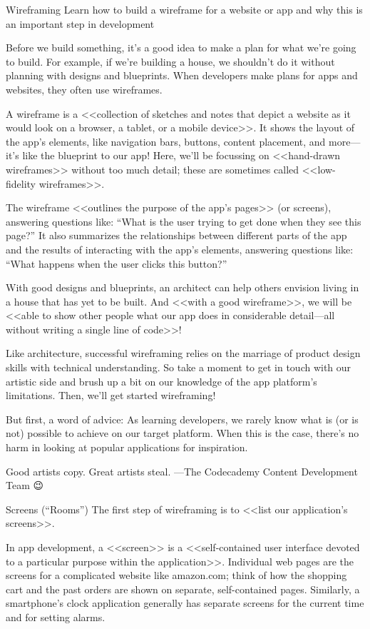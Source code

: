 Wireframing
        Learn how to build a wireframe for a website or app and why this is an important step in development
    
        Before we build something, it’s a good idea to make a plan for what we’re going to build. For example, if we’re building a house, we shouldn’t do it without planning with designs and blueprints. When developers make plans for apps and websites, they often use wireframes.

        A wireframe is a <<collection of sketches and notes that depict a website as it would look on a browser, a tablet, or a mobile device>>. It shows the layout of the app’s elements, like navigation bars, buttons, content placement, and more—it’s like the blueprint to our app! Here, we’ll be focussing on <<hand-drawn wireframes>> without too much detail; these are sometimes called <<low-fidelity wireframes>>.

        The wireframe <<outlines the purpose of the app’s pages>> (or screens), answering questions like: “What is the user trying to get done when they see this page?” It also summarizes the relationships between different parts of the app and the results of interacting with the app’s elements, answering questions like: “What happens when the user clicks this button?”

        With good designs and blueprints, an architect can help others envision living in a house that has yet to be built. And <<with a good wireframe>>, we will be <<able to show other people what our app does in considerable detail—all without writing a single line of code>>!

        Like architecture, successful wireframing relies on the marriage of product design skills with technical understanding. So take a moment to get in touch with our artistic side and brush up a bit on our knowledge of the app platform’s limitations. Then, we’ll get started wireframing!

        But first, a word of advice: As learning developers, we rarely know what is (or is not) possible to achieve on our target platform. When this is the case, there’s no harm in looking at popular applications for inspiration.

        Good artists copy. Great artists steal.
            —The Codecademy Content Development Team 😉 

Screens (“Rooms”)
        The first step of wireframing is to <<list our application’s screens>>.

        In app development, a <<screen>> is a <<self-contained user interface devoted to a particular purpose within the application>>. Individual web pages are the screens for a complicated website like amazon.com; think of how the shopping cart and the past orders are shown on separate, self-contained pages. Similarly, a smartphone’s clock application generally has separate screens for the current time and for setting alarms.

